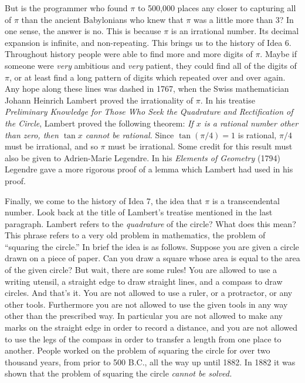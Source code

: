 \documentclass[twoside,twocolumn,12pt]{amsart}
\theoremstyle{plain}
\theoremstyle{definition}
\begin{document}
But is the programmer who found $\pi$ to 500,000 places any closer to
capturing all of $\pi$ than the ancient Babylonians who knew that
$\pi$ was a little more than 3? In one sense, the answer is no. This
is because $\pi$ is an irrational number. Its decimal expansion
is infinite, and non-repeating. This brings us to the history of Idea 6.
Throughout history people were able to find more and more digits
of $\pi$. Maybe if someone were \emph{very} ambitious and \emph{very}
patient, they could find all of the digits of $\pi$, or at least find
a long pattern of digits which repeated over and over again. Any hope
along these lines was dashed in 1767, when the Swiss mathematician
Johann Heinrich Lambert proved the irrationality of $\pi$. In his
treatise \emph{Preliminary Knowledge for Those Who Seek the Quadrature
and Rectification of the Circle}, Lambert proved the following theorem:
\emph{If $x$ is a rational number other than zero, then $\tan x$ cannot
be rational.} Since $\tan(\pi/4)=1$ is rational, $\pi/4$ must be irrational,
and so $\pi$ must be irrational. Some credit for this result must also
be given to Adrien-Marie Legendre. In his \emph{Elements of Geometry} (1794)
Legendre gave a more rigorous proof of a lemma which Lambert had used
in his proof.

Finally, we come to the history of Idea 7, the idea that $\pi$ is a
transcendental number.  Look back at the title of Lambert's treatise
mentioned in the last paragraph. Lambert refers to the \emph{quadrature}
of the circle? What does this mean? This phrase refers to a very old
problem in mathematics,
 the problem of ``squaring the circle.'' In brief the idea is as
follows. Suppose you are given a circle drawn on a piece of paper. Can
you draw a square whose area is equal to the area of the given circle?
But wait, there are some rules! You are allowed to use a writing
utensil,
a straight edge to draw straight lines, and a compass to draw circles.
And that's it. You are not allowed to use a ruler, or a protractor,
or any other tools. Furthermore you are not allowed to use the given
tools in any way other than the prescribed way. In particular you are
not allowed to make any marks on the straight edge in order to record
a distance, and you are not allowed to use the legs of the compass in
order to transfer a length from one place to another.  People worked
on the problem of squaring the circle for over two thousand years, from
prior to 500 B.C., all the way up until 1882. In 1882 it was shown
that the problem of squaring the circle \emph{cannot be solved.}
\end{document}
